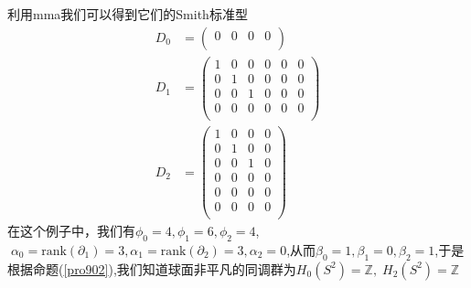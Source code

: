 利用mma我们可以得到它们的Smith标准型
\begin{equation*}
    \begin{aligned}
    D_{0}&=\left(\begin{array}{cccc}
     0 & 0  &0 &0 \\
    \end{array}\right)\\
    D_{1}&=\left(\begin{array}{cccccc}
        1 &0&0&0&0&0  \\
        0 &1&0&0&0&0\\
        0 &0&1&0&0&0\\
        0 &0&0&0&0&0\\
    \end{array}\right)\\
    D_{2}&=\left(\begin{array}{cccc}
        1 & 0&0&0 \\
        0 & 1&0&0 \\
        0 & 0&1&0 \\
        0 & 0&0&0 \\
        0 & 0&0&0 \\
        0 & 0&0&0 \\
    \end{array}\right)
    \end{aligned}
\end{equation*}
在这个例子中，我们有$\phi_{0}=4,\phi_{1}=6,\phi_{2}=4$,$\;\alpha_{0}=\text{rank}(\partial_{1})=3,\alpha_{1}=\text{rank}(\partial_{2})=3,\alpha_{2}=0$,从而$\beta_{0}=1,\beta_{1}=0,\beta_{2}=1$,于是根据命题(\ref{pro902}),我们知道球面非平凡的同调群为$H_{0}(S^{2})=\mathbb{Z},\;H_{2}(S^{2})=\mathbb{Z}$
